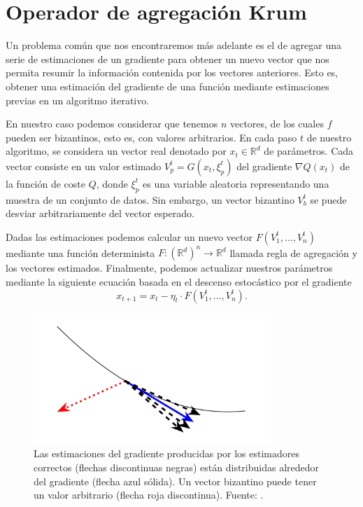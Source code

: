 \chapter{Operador de agregación Krum}\label{sec:krum}
Un problema común que nos encontraremos más adelante es el de agregar una serie de estimaciones de un gradiente para obtener un nuevo vector que nos permita resumir la información contenida por los vectores anteriores. Esto es, obtener una estimación del gradiente de una función mediante estimaciones previas en un algoritmo iterativo.

En nuestro caso podemos considerar que tenemos $n$ vectores, de los cuales $f$ pueden ser bizantinos, esto es, con valores arbitrarios. En cada paso $t$ de nuestro algoritmo, se considera un vector real denotado por $x_t \in \mathbb{R}^d$ de parámetros. Cada vector consiste en un valor estimado $V_p^t=G(x_t, \xi_p^t)$ del gradiente $\nabla Q(x_t)$ de la función de coste $Q$, donde $\xi_p^t$ es una variable aleatoria representando una muestra de un conjunto de datos. Sin embargo, un vector bizantino $V_b^t$ se puede desviar arbitrariamente del vector esperado.

Dadas las estimaciones podemos calcular un nuevo vector $F(V_1^t, \ldots, V_n^t)$ mediante una función determinista $F: (\mathbb{R}^d)^n \to \mathbb{R}^d$ llamada regla de agregación y los vectores estimados. Finalmente, podemos actualizar nuestros parámetros mediante la siguiente ecuación basada en el descenso estocástico por el gradiente
\begin{equation}
	x_{t+1} = x_{t} - \eta_t \cdot F(V_1^t, \ldots, V_n^t).
\end{equation}

\begin{figure}[h]
    \centering
    \includegraphics[width=0.8\textwidth]{figuras/krum_gradient.png}
    \caption{Las estimaciones del gradiente producidas por los estimadores correctos (flechas discontinuas negras) están distribuidas alrededor del gradiente (flecha azul sólida). Un vector bizantino puede tener un valor arbitrario (flecha roja discontinua). Fuente: \cite{krum-2017}.}
    \label{fig:krumgradient}
\end{figure}

